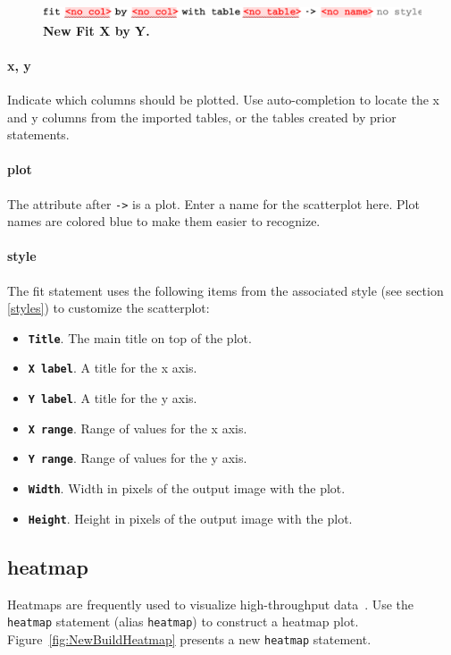 \begin{figure}[h!tbp]
  \centering
  \includegraphics[width=\figWidthWide]{figures/NewFitXByY.pdf}
\caption[New Fit X by Y.]{\textbf{New Fit X by Y.}}
\label{fig:NewFitXByY}
\end{figure}

\paragraph{x, y}
Indicate which columns should be plotted. Use auto-completion to locate the x and y columns from the imported tables, or the tables created by prior statements. 

\paragraph{plot}
The attribute after \texttt{->} is a plot. Enter a name for the scatterplot here. Plot names are colored blue to make them easier to recognize.

\paragraph{style}
The fit statement uses the following items from the associated style (see section \ref{styles}) to customize the scatterplot:
\begin{itemize}
\item \textbf{ \texttt{Title}}. The main title on top of the plot.
\item \textbf{ \texttt{X label}}. A title for the x axis.
\item \textbf{ \texttt{Y label}}. A title for the y axis.
\item \textbf{ \texttt{X range}}. Range of values for the x axis.
\item \textbf{ \texttt{Y range}}. Range of values for the y axis.
\item \textbf{ \texttt{Width}}. Width in pixels of the output image with the plot.
\item \textbf{ \texttt{Height}}. Height in pixels of the output image with the plot. 
\end{itemize}

\subsection{heatmap}
Heatmaps are frequently used to visualize high-throughput data~\cite{Cook2007}. Use the \texttt{heatmap} statement (alias \texttt{heatmap}) to construct a heatmap plot. Figure~\ref{fig:NewBuildHeatmap} presents a new \texttt{heatmap} statement.

